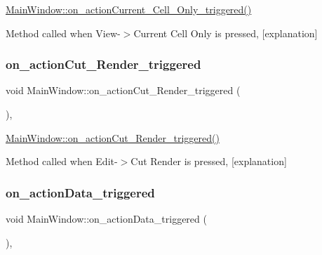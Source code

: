 \hyperlink{class_main_window_a58acaabf35d71b094d373c5a8f4f333a}{Main\+Window\+::on\+\_\+action\+Current\+\_\+\+Cell\+\_\+\+Only\+\_\+triggered()} 

Method called when View-\/$>$Current Cell Only is pressed, \mbox{[}explanation\mbox{]} \mbox{\label{class_main_window_aab15905e4c662653ff9e22457ab18964}} 
\subsubsection{\texorpdfstring{on\+\_\+action\+Cut\+\_\+\+Render\+\_\+triggered}{on\_actionCut\_Render\_triggered}}
{\footnotesize\ttfamily void Main\+Window\+::on\+\_\+action\+Cut\+\_\+\+Render\+\_\+triggered (\begin{DoxyParamCaption}{ }\end{DoxyParamCaption})\hspace{0.3cm}{\ttfamily [private]}, {\ttfamily [slot]}}



\hyperlink{class_main_window_aab15905e4c662653ff9e22457ab18964}{Main\+Window\+::on\+\_\+action\+Cut\+\_\+\+Render\+\_\+triggered()} 

Method called when Edit-\/$>$Cut Render is pressed, \mbox{[}explanation\mbox{]} \mbox{\label{class_main_window_a3ca9d4a4b5afe31afaff0d89a84c68fb}} 
\subsubsection{\texorpdfstring{on\+\_\+action\+Data\+\_\+triggered}{on\_actionData\_triggered}}
{\footnotesize\ttfamily void Main\+Window\+::on\+\_\+action\+Data\+\_\+triggered (\begin{DoxyParamCaption}{ }\end{DoxyParamCaption})\hspace{0.3cm}{\ttfamily [private]}, {\ttfamily [slot]}}



